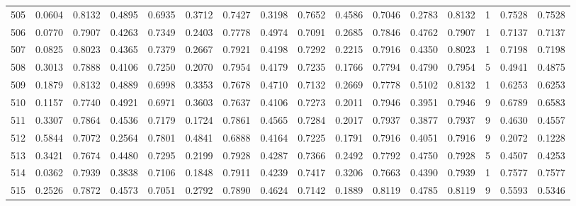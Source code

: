 \begin{tabular}{lrrrrrrrrrrrrrrr}
505 &      0.0604 &  0.8132 &  0.4895 &  0.6935 &  0.3712 &  0.7427 &  0.3198 &  0.7652 &  0.4586 &  0.7046 &   0.2783 &     0.8132 &      1 &                    0.7528 &                     0.7528 \\
506 &      0.0770 &  0.7907 &  0.4263 &  0.7349 &  0.2403 &  0.7778 &  0.4974 &  0.7091 &  0.2685 &  0.7846 &   0.4762 &     0.7907 &      1 &                    0.7137 &                     0.7137 \\
507 &      0.0825 &  0.8023 &  0.4365 &  0.7379 &  0.2667 &  0.7921 &  0.4198 &  0.7292 &  0.2215 &  0.7916 &   0.4350 &     0.8023 &      1 &                    0.7198 &                     0.7198 \\
508 &      0.3013 &  0.7888 &  0.4106 &  0.7250 &  0.2070 &  0.7954 &  0.4179 &  0.7235 &  0.1766 &  0.7794 &   0.4790 &     0.7954 &      5 &                    0.4941 &                     0.4875 \\
509 &      0.1879 &  0.8132 &  0.4889 &  0.6998 &  0.3353 &  0.7678 &  0.4710 &  0.7132 &  0.2669 &  0.7778 &   0.5102 &     0.8132 &      1 &                    0.6253 &                     0.6253 \\
510 &      0.1157 &  0.7740 &  0.4921 &  0.6971 &  0.3603 &  0.7637 &  0.4106 &  0.7273 &  0.2011 &  0.7946 &   0.3951 &     0.7946 &      9 &                    0.6789 &                     0.6583 \\
511 &      0.3307 &  0.7864 &  0.4536 &  0.7179 &  0.1724 &  0.7861 &  0.4565 &  0.7284 &  0.2017 &  0.7937 &   0.3877 &     0.7937 &      9 &                    0.4630 &                     0.4557 \\
512 &      0.5844 &  0.7072 &  0.2564 &  0.7801 &  0.4841 &  0.6888 &  0.4164 &  0.7225 &  0.1791 &  0.7916 &   0.4051 &     0.7916 &      9 &                    0.2072 &                     0.1228 \\
513 &      0.3421 &  0.7674 &  0.4480 &  0.7295 &  0.2199 &  0.7928 &  0.4287 &  0.7366 &  0.2492 &  0.7792 &   0.4750 &     0.7928 &      5 &                    0.4507 &                     0.4253 \\
514 &      0.0362 &  0.7939 &  0.3838 &  0.7106 &  0.1848 &  0.7911 &  0.4239 &  0.7417 &  0.3206 &  0.7663 &   0.4390 &     0.7939 &      1 &                    0.7577 &                     0.7577 \\
515 &      0.2526 &  0.7872 &  0.4573 &  0.7051 &  0.2792 &  0.7890 &  0.4624 &  0.7142 &  0.1889 &  0.8119 &   0.4785 &     0.8119 &      9 &                    0.5593 &                     0.5346 \\

\end{tabular}
